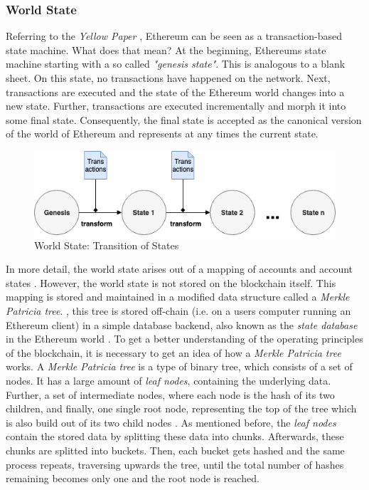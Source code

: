 \subsubsection{World State}
\label{sec:world_state}
Referring to the \textit{Yellow Paper} , Ethereum can be seen as a transaction-based state machine. What does that mean? At the beginning, Ethereums state machine starting with a so called \textit{"genesis state"}. This is analogous to a blank sheet. On this state, no transactions have happened on the network. Next, transactions are executed and the state of the Ethereum world changes into a new state. Further, transactions are executed incrementally and morph it into some final state. Consequently, the final state is accepted as the canonical version of the world of Ethereum and represents at any times the current state.

\begin{figure}[htbp]
	\centering
	\includegraphics[width=.9\linewidth]{./figures/state_transition.png}
	\caption{World State: Transition of States}
	\label{figure:state_transition}
\end{figure}

In more detail, the world state arises out of a mapping of accounts and account states . However, the world state is not stored on the blockchain itself. This mapping is stored and maintained in a modified data structure called a \textit{Merkle Patricia tree}. , this tree is stored off-chain (i.e. on a users computer running an Ethereum client) in a simple database backend, also known as the \textit{state database} in the Ethereum world . To get a better understanding of the operating principles of the blockchain, it is necessary to get an idea of how a \textit{Merkle Patricia tree} works. A \textit{Merkle Patricia tree} is a type of binary tree, which consists of a set of nodes. It has a large amount of 
\textit{leaf nodes}, containing the underlying data. Further, a set of intermediate nodes, where each node is the hash of its two children, and finally, one single root node, representing the top of the tree which is also build out of its two child nodes  .
As mentioned before, the \textit{leaf nodes} contain the stored data by splitting these data into chunks. Afterwards, these chunks are splitted into buckets. Then, each bucket gets hashed and the same process repeats, traversing upwards the tree, until the total number of hashes remaining becomes only one and the root node is reached. 

